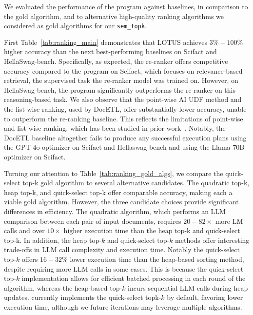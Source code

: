 


We evaluated the performance of the \sys program against baselines, in comparison to the gold algorithm, and to alternative high-quality ranking algorithms we considered as gold algorithms for our \verb|sem_topk|. 

First Table~\ref{tab:ranking_main} demonstrates that LOTUS achieves $3\% - 100\%$ higher accuracy than the next best-performing baselines on Scifact and HellaSwag-bench. Specifically, as expected, the re-ranker offers competitive accuracy compared to the \sys program on Scifact, which focuses on relevance-based retrieval, the supervised task the re-ranker model was trained on. However, on HellaSwag-bench, the \sys program significantly outperforms the re-ranker on this reasoning-based task. We also observe that the point-wise AI UDF method and the list-wise ranking, used by DocETL, offer substantially lower accuracy, unable to outperform the re-ranking baseline. This reflects the limitations of point-wise and list-wise ranking, which has been studied in prior work~\cite{qin_large_2024}. Notably, the DocETL baseline altogether fails to produce any successful execution plans using the GPT-4o optimizer on Scifact and Hellaswag-bench and using the Llama-70B optimizer on Scifact.

Turning our attention to Table~\ref{tab:ranking_gold_algs}, we compare the quick-select top-k gold algorithm to several alternative candidates. The quadratic top-k, heap top-k, and quick-select top-k offer comparable accuracy, making each a viable gold algorithm. However, the three candidate choices provide significant differences in efficiency. 
The quadratic algorithm, which performs an LLM comparison between each pair of input documents, requires $20 - 82\times$ more LM calls and over $10\times$ higher execution time than the heap top-k and quick-select top-k.
In addition, the heap top-$k$ and quick-select top-$k$ methods offer interesting trade-offs in LLM call complexity and execution time. 
Notably the quick-select top-$k$ offers $16-32\%$ lower execution time than the heap-based sorting method, despite requiring more LLM calls in some cases. 
This is because the quick-select top-$k$ implementation allows for efficient batched processing in each round of the algorithm, whereas the heap-based top-$k$ incurs sequential LLM calls during heap updates. 
\sys currently implements the quick-select topk-$k$ by default, favoring lower execution time, although we future iterations may leverage multiple algorithms.

